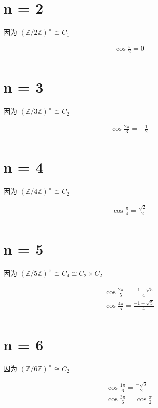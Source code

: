 \chapter{n = 2}

因为 $(\mathbb{Z}/2\mathbb{Z})^{×}≅ C_1 $

$$
\begin{aligned}
\cos\frac{π}{2} = 0\\
\end{aligned}
$$

\chapter{n = 3}

因为 $(\mathbb{Z}/3\mathbb{Z})^{×}≅ C_2 $

$$
\begin{aligned}
\cos\frac{2π}{3} = -\frac{1}{2}\\
\end{aligned}
$$

\chapter{n = 4}

因为 $(\mathbb{Z}/4\mathbb{Z})^{×}≅ C_2 $

$$
\begin{aligned}
\cos\frac{ π}{4} = \frac{\sqrt{2}}{2}\\
\end{aligned}
$$

\chapter{n = 5}

因为 $(\mathbb{Z}/5\mathbb{Z})^{×}≅ C_4 ≅ C_2 × C_2$  

$$
\begin{aligned}
\cos\frac{2π}{5} = \frac{-1+\sqrt{5}}{4}\\
\cos\frac{4π}{5} = \frac{-1-\sqrt{5}}{4}\\
\end{aligned}
$$

\chapter{n = 6}

因为 $(\mathbb{Z}/6\mathbb{Z})^{×}≅ C_2 $

$$
\begin{aligned}
\cos\frac{1π}{6} = \frac{-\sqrt{3}}{2}\\
\cos\frac{3π}{6} = \cos\frac{π}{2}\\
\end{aligned}
$$